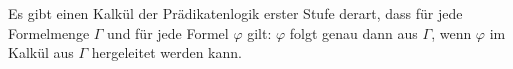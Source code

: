 

\begin{theorem}
	Es gibt einen Kalkül der Prädikatenlogik erster Stufe derart, dass für jede Formelmenge
\( \Gamma \) und für jede Formel
\( \varphi \) gilt:
\( \varphi \) folgt genau dann aus
\( \Gamma \), wenn
\( \varphi \) im Kalkül aus
\( \Gamma \)  hergeleitet werden kann.
\end{theorem}

